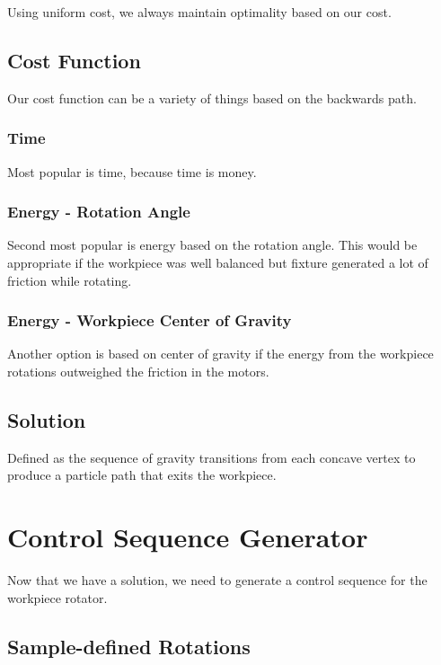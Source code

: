 Using uniform cost, we always maintain optimality based on our cost.

	\subsection{Cost Function}

Our cost function can be a variety of things based on the backwards path.

		\subsubsection{Time}

Most popular is time, because time is money.

		\subsubsection{Energy - Rotation Angle}

Second most popular is energy based on the rotation angle. This would be appropriate if the workpiece was well balanced but fixture generated a lot of friction while rotating.

		\subsubsection{Energy - Workpiece Center of Gravity}

Another option is based on center of gravity if the energy from the workpiece rotations outweighed the friction in the motors.

	\subsection{Solution}

		Defined as the sequence of gravity transitions from each concave vertex to produce a particle path that exits the workpiece.

\section{Control Sequence Generator}

Now that we have a solution, we need to generate a control sequence for the workpiece rotator.

	\subsection{Sample-defined Rotations}

